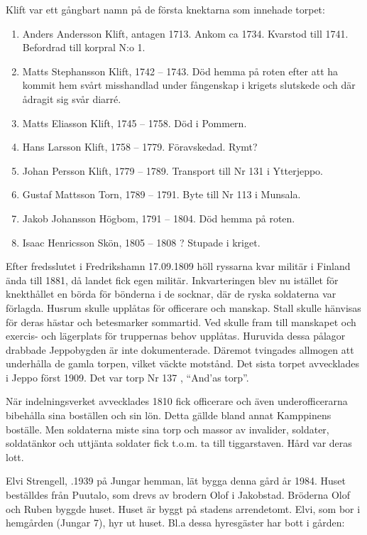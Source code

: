 Klift var ett gångbart namn på de första knektarna som innehade  torpet:
\begin{enumerate}
  \item Anders Andersson Klift, antagen 1713. Ankom ca 1734. Kvarstod till 1741. Befordrad till korpral N:o 1.
  \item Matts Stephansson Klift, 1742 – 1743. Död hemma på roten efter att ha kommit hem svårt misshandlad under fångenskap i krigets slutskede och där ådragit sig svår diarré.
  \item Matts Eliasson Klift, 1745 – 1758. Död i Pommern.
  \item Hans Larsson Klift, 1758 – 1779. Föravskedad. Rymt?
  \item Johan Persson Klift, 1779 – 1789. Transport till Nr 131 i Ytterjeppo.
  \item Gustaf Mattsson Torn, 1789 – 1791. Byte till Nr 113 i Munsala.
  \item Jakob Johansson Högbom, 1791 – 1804. Död hemma på roten.
  \item Isaac Henricsson Skön,  1805 – 1808 ? Stupade i kriget.
\end{enumerate}
Efter fredsslutet i Fredrikshamn 17.09.1809 höll ryssarna kvar militär i Finland ända till 1881, då landet fick egen militär. Inkvarteringen blev nu istället för knekthållet en börda för bönderna i de socknar, där de ryska soldaterna var förlagda. Husrum skulle upplåtas för officerare och manskap. Stall skulle hänvisas för deras hästar och betesmarker sommartid. Ved skulle fram till manskapet och exercis- och lägerplats för truppernas behov upplåtas. Huruvida dessa pålagor drabbade Jeppobygden är inte dokumenterade. Däremot tvingades allmogen att underhålla de gamla torpen, vilket väckte motstånd. Det sista torpet avvecklades i Jeppo först 1909. Det var torp Nr 137 , ``And'as torp''.

När indelningsverket avvecklades 1810 fick officerare och även underofficerarna bibehålla sina boställen och sin lön. Detta gällde bland annat Kamppinens boställe. Men soldaterna miste sina torp och massor av invalider, soldater, soldatänkor och uttjänta soldater fick t.o.m. ta till tiggarstaven. Hård var deras lott.




Elvi Strengell, .1939 på Jungar hemman, lät bygga denna gård år 1984. Huset beställdes från Puutalo, som drevs av brodern Olof i Jakobstad. Bröderna Olof och Ruben byggde huset. Huset är byggt på stadens arrendetomt. Elvi, som bor i hemgården (Jungar 7), hyr ut huset. Bl.a dessa hyresgäster har bott i gården:

